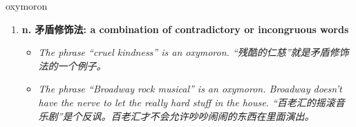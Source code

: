 
\begin{frame}
{\huge oxymoron}
\begin{center}
\begin{enumerate}\Large
  \item \textbf{n. 矛盾修饰法: a combination of contradictory or incongruous words}
  \begin{itemize}
    \item \em{\Large{The phrase “cruel kindness” is an oxymoron. “残酷的仁慈”就是矛盾修饰法的一个例子。}}
    \item \em{\Large{The phrase “Broadway rock musical” is an oxymoron. Broadway doesn't have the nerve to let the really hard stuff in the house. “百老汇的摇滚音乐剧”是个反讽。百老汇才不会允许吵吵闹闹的东西在里面演出。}}
  \end{itemize}
\end{enumerate}
\end{center}
\end{frame}
